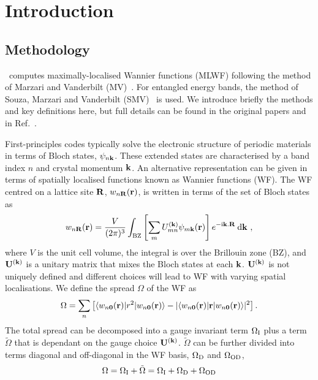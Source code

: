 \chapter{Introduction}

\section{Methodology}\label{sec:method}
\wannier\ computes maximally-localised Wannier functions (MLWF)
following the method of Marzari and Vanderbilt (MV)~\cite{MV}.
For entangled energy bands, the method of Souza, Marzari and
Vanderbilt (SMV)~\cite{SMV} is used. We introduce briefly the methods
and key definitions here, but full details can be found in the
original papers and in Ref.~\cite{W90}.

First-principles codes typically solve the electronic structure of
periodic materials in terms of Bloch states, $\psi_{n{\bf k}}$. 
These extended states are characterised by a band index $n$ and crystal
momentum ${\bf k}$. An alternative representation can be given in terms
of spatially localised functions known as Wannier functions (WF). The WF 
centred on a lattice site ${\bf R}$, $w_{n{\bf R}}({\bf r})$, 
is written in terms of the set of Bloch states as
\begin{equation}
w_{n{\bf R}}({\bf r})=\frac{V}{(2\pi)^3}\int_{\mathrm{BZ}}
\left[\sum_{m} U^{({\bf k})}_{mn} \psi_{m{\bf k}}({\bf
    r})\right]e^{-\mathrm{i}{\bf k}.{\bf R}} \:\mathrm{d}{\bf k} \ , 
\end{equation}
where $V$ is the unit cell volume, the integral is over the Brillouin
zone (BZ), and $\mathbf{U}^{(\mathbf{k})}$ is a unitary matrix that mixes the Bloch 
states at each ${\bf k}$. $\mathbf{U}^{(\mathbf{k})}$ is not uniquely defined and different
choices will lead to WF with varying spatial localisations. We define
the spread $\Omega$ of the WF as 
\begin{equation}
\Omega=\sum_n \left[\langle w_{n{\bf 0}}({\bf r})| r^2 | w_{n{\bf
      0}}({\bf r}) \rangle - | \langle w_{n{\bf 0}}({\bf r})| {\bf r}
      | w_{n{\bf 0}}({\bf r}) \rangle |^2 \right].
\end{equation}
The total spread can be decomposed into a gauge invariant term
$\Omega_{\rm I}$ plus a term ${\tilde \Omega}$ that is dependant on the gauge
choice $\mathbf{U}^{(\mathbf{k})}$. ${\tilde \Omega}$ can
be further divided into terms diagonal and off-diagonal in the WF basis,
$\Omega_{\rm D}$ and $\Omega_{\rm OD}$,
\begin{equation}
\Omega=\Omega_{\rm I}+{\tilde \Omega}=\Omega_{\rm I}+\Omega_{\rm
  D}+\Omega_{\rm OD} 
\end{equation}
